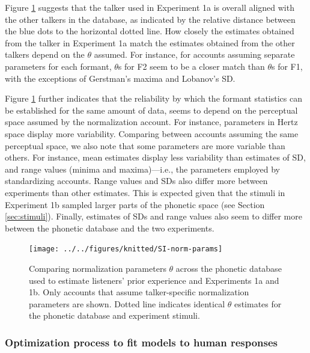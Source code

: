 \documentclass[preprint]{JASA}
\begin{document}
Figure \ref{fig:SI-norm-params} suggests that the talker used in Experiment 1a is overall aligned with the other talkers in the database, as indicated by the relative distance between the blue dots to the horizontal dotted line. How closely the estimates obtained from the talker in Experiment 1a match the estimates obtained from the other talkers depend on the \(\theta\) assumed. For instance, for accounts assuming separate parameters for each formant, \(\theta\)s for F2 seem to be a closer match than \(\theta\)s for F1, with the exceptions of Gerstman's maxima and Lobanov's SD.

Figure \ref{fig:SI-norm-params} further indicates that the reliability by which the formant statistics can be established for the same amount of data, seems to depend on the perceptual space assumed by the normalization account. For instance, parameters in Hertz space display more variability. Comparing between accounts assuming the same perceptual space, we also note that some parameters are more variable than others. For instance, mean estimates display less variability than estimates of SD, and range values (minima and maxima)---i.e., the parameters employed by standardizing accounts. Range values and SDs also differ more between experiments than other estimates. This is expected given that the stimuli in Experiment 1b sampled larger parts of the phonetic space (see Section \ref{sec:stimuli}). Finally, estimates of SDs and range values also seem to differ more between the phonetic database and the two experiments.



\begin{figure}

{\centering \texttt{[image: ../../figures/knitted/SI-norm-params]} 

}

\caption{Comparing normalization parameters \(\theta\) across the phonetic database used to estimate listeners' prior experience \citep{xie-jaeger2020} and Experiments 1a and 1b. Only accounts that assume talker-specific normalization parameters are shown. Dotted line indicates identical \(\theta\) estimates for the phonetic database and experiment stimuli.}\label{fig:SI-norm-params}
\end{figure}

\subsubsection{Optimization process to fit models to human responses}\label{sec:SI-optim-process}
\end{document}
